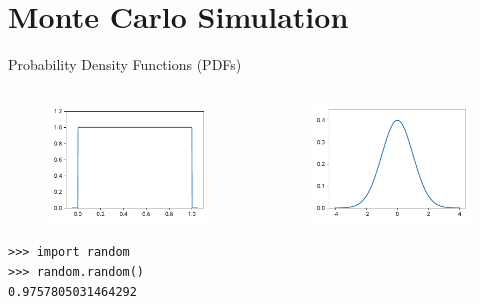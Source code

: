 \documentclass[12pt, aspectratio=149]{beamer}
\theoremstyle{plain}
\begin{document}
\section{Monte Carlo Simulation}

\begin{frame}[fragile]{Probability Density Functions (PDFs)}
	\begin{columns}
	\begin{column}{0.5\textwidth}
		\begin{center}
		 \begin{figure}
			 \centering
			 \includegraphics[width=0.99\linewidth]{figures/uniform}
		 \end{figure}
		 \begin{verbatim}
>>> import random
>>> random.random()
0.9757805031464292
		 \end{verbatim}
		 \end{center}
	\end{column}
	\begin{column}{0.5\textwidth}  %
		\begin{center}
		 \begin{figure}
			 \centering
			 \includegraphics[width=0.99\linewidth]{figures/normal}

\end{figure}
\end{center}
\end{column}
\end{columns}
\end{frame}
\end{document}
